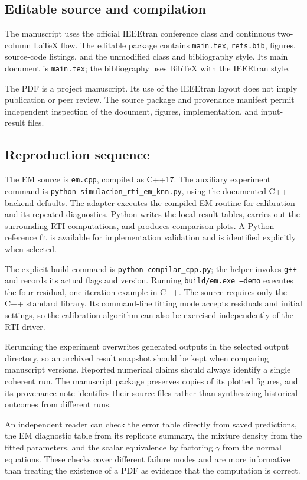 \documentclass[conference,letterpaper]{IEEEtran}
\begin{document}
\subsection{Editable source and compilation}
The manuscript uses the official IEEEtran conference class and continuous two-column LaTeX flow. The editable package contains \texttt{main.tex}, \texttt{refs.bib}, figures, source-code listings, and the unmodified class and bibliography style. Its main document is \texttt{main.tex}; the bibliography uses BibTeX with the IEEEtran style.

The PDF is a project manuscript. Its use of the IEEEtran layout does not imply publication or peer review. The source package and provenance manifest permit independent inspection of the document, figures, implementation, and input-result files.

\subsection{Reproduction sequence}
The EM source is \texttt{em.cpp}, compiled as C++17. The auxiliary experiment command is \texttt{python simulacion\_rti\_em\_knn.py}, using the documented C++ backend defaults. The adapter executes the compiled EM routine for calibration and its repeated diagnostics. Python writes the local result tables, carries out the surrounding RTI computations, and produces comparison plots. A Python reference fit is available for implementation validation and is identified explicitly when selected.

The explicit build command is \texttt{python compilar\_cpp.py}; the helper invokes \texttt{g++} and records its actual flags and version. Running \texttt{build/em.exe --demo} executes the four-residual, one-iteration example in C++. The source requires only the C++ standard library. Its command-line fitting mode accepts residuals and initial settings, so the calibration algorithm can also be exercised independently of the RTI driver.

Rerunning the experiment overwrites generated outputs in the selected output directory, so an archived result snapshot should be kept when comparing manuscript versions. Reported numerical claims should always identify a single coherent run. The manuscript package preserves copies of its plotted figures, and its provenance note identifies their source files rather than synthesizing historical outcomes from different runs.

An independent reader can check the error table directly from saved predictions, the EM diagnostic table from its replicate summary, the mixture density from the fitted parameters, and the scalar equivalence by factoring $\gamma$ from the normal equations. These checks cover different failure modes and are more informative than treating the existence of a PDF as evidence that the computation is correct.
\end{document}
